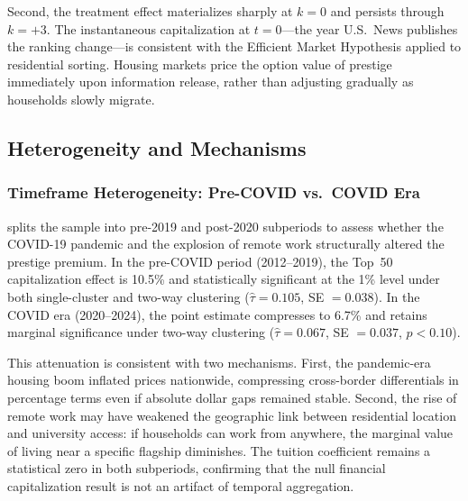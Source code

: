 \documentclass[12pt]{article}
\begin{document}
Second, the treatment effect materializes sharply at $k = 0$ and persists through $k = +3$. The instantaneous capitalization at $t = 0$---the year U.S.\ News publishes the ranking change---is consistent with the Efficient Market Hypothesis applied to residential sorting. Housing markets price the option value of prestige immediately upon information release, rather than adjusting gradually as households slowly migrate.

\subsection{Heterogeneity and Mechanisms}

\subsubsection{Timeframe Heterogeneity: Pre-COVID vs.\ COVID Era}

 splits the sample into pre-2019 and post-2020 subperiods to assess whether the COVID-19 pandemic and the explosion of remote work structurally altered the prestige premium. In the pre-COVID period (2012--2019), the Top~50 capitalization effect is 10.5\% and statistically significant at the 1\% level under both single-cluster and two-way clustering ($\hat{\tau} = 0.105$, SE $= 0.038$). In the COVID era (2020--2024), the point estimate compresses to 6.7\% and retains marginal significance under two-way clustering ($\hat{\tau} = 0.067$, SE $= 0.037$, $p < 0.10$).

This attenuation is consistent with two mechanisms. First, the pandemic-era housing boom inflated prices nationwide, compressing cross-border differentials in percentage terms even if absolute dollar gaps remained stable. Second, the rise of remote work may have weakened the geographic link between residential location and university access: if households can work from anywhere, the marginal value of living near a specific flagship diminishes. The tuition coefficient remains a statistical zero in both subperiods, confirming that the null financial capitalization result is not an artifact of temporal aggregation.
\end{document}
